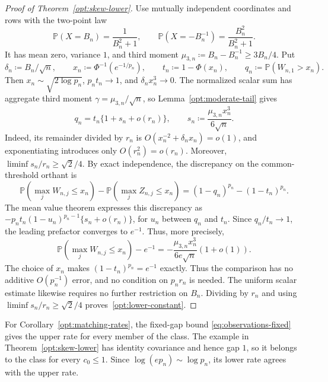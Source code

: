 \documentclass[11pt,letterpaper]{article}
\theoremstyle{remark}
\newcommand{\Pp}{\mathbb P}
\begin{document}
\begin{proof}[Proof of Theorem~\ref{opt:skew-lower}]
Use mutually independent coordinates and rows with the two-point law
\begin{equation}
 \Pp(X=B_n)=\frac1{B_n^2+1},\qquad
 \Pp(X=-B_n^{-1})=\frac{B_n^2}{B_n^2+1}.
 \label{opt:two-point-law}
\end{equation}
It has mean zero, variance \(1\), and third moment
\(\mu_{3,n}\coloneqq B_n-B_n^{-1}\ge3B_n/4\). Put
\[
 \delta_n\coloneqq B_n/\sqrt n,\qquad
 x_n\coloneqq\Phi^{-1}(e^{-1/p_n}),\qquad
 t_n\coloneqq1-\Phi(x_n),\qquad q_n\coloneqq\Pp(W_{n,1}>x_n).
\]
Then \(x_n\sim\sqrt{2\log p_n}\), \(p_nt_n\to1\), and
\(\delta_nx_n^3\to0\). The normalized scalar sum has aggregate
third moment \(\gamma=\mu_{3,n}/\sqrt n\), so
Lemma~\ref{opt:moderate-tail} gives
\begin{equation}
 q_n=t_n\{1+s_n+o(r_n)\},\qquad
 s_n\coloneqq\frac{\mu_{3,n}x_n^3}{6\sqrt n}.
 \label{opt:tail-linearization}
\end{equation}
Indeed, its remainder divided by \(r_n\) is
\(O(x_n^{-2}+\delta_nx_n)=o(1)\), and exponentiating introduces only
\(O(r_n^2)=o(r_n)\). Moreover,
\(\liminf s_n/r_n\ge\sqrt2/4\).
By exact independence, the discrepancy on the common-threshold orthant is
\[
 \Pp(\max_jW_{n,j}\le x_n)-\Pp(\max_jZ_{n,j}\le x_n)
 =(1-q_n)^{p_n}-(1-t_n)^{p_n}.
\]
The mean value theorem expresses this discrepancy as
\(-p_nt_n(1-u_n)^{p_n-1}\{s_n+o(r_n)\}\), for \(u_n\) between
\(q_n\) and \(t_n\). Since \(q_n/t_n\to1\), the leading prefactor
converges to \(e^{-1}\). Thus, more precisely,
\begin{equation}
 \Pp(\max_jW_{n,j}\le x_n)-e^{-1}
 =-\frac{\mu_{3,n}x_n^3}{6e\sqrt n}(1+o(1)).
 \label{opt:exact-product-asymptotic}
\end{equation}
The choice of \(x_n\) makes \((1-t_n)^{p_n}=e^{-1}\) exactly.
Thus the comparison has no additive \(O(p_n^{-1})\) error, and no
condition on \(p_nr_n\) is needed. The uniform scalar estimate likewise
requires no further restriction on \(B_n\). Dividing by \(r_n\) and
using \(\liminf s_n/r_n\ge\sqrt2/4\) proves~\eqref{opt:lower-constant}.
\end{proof}

For Corollary~\ref{opt:matching-rates}, the fixed-gap bound
\eqref{eq:observations-fixed} gives the upper rate for every member of
the class. The example in Theorem~\ref{opt:skew-lower} has identity
covariance and hence gap \(1\), so it belongs to the class for every
\(c_0\le1\). Since \(\log(ep_n)\sim\log p_n\), its lower rate agrees
with the upper rate.
\end{document}
